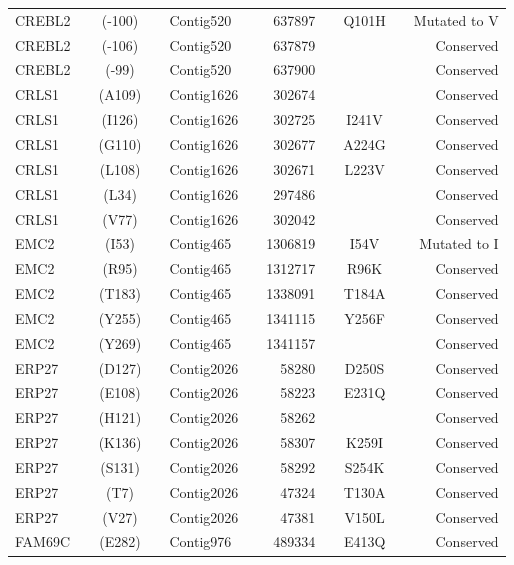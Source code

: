 \begin{center}
\begin{longtable}{lccclcrcccr}
CREBL2   & & (-100)  & & Contig520  & & 637897   & & Q101H   & & Mutated to V   \\
CREBL2   & & (-106)  & & Contig520  & & 637879   & &         & & Conserved      \\
CREBL2   & & (-99)   & & Contig520  & & 637900   & &         & & Conserved      \\
CRLS1    & & (A109)  & & Contig1626 & & 302674   & &         & & Conserved      \\
CRLS1    & & (I126)  & & Contig1626 & & 302725   & & I241V   & & Conserved      \\
CRLS1    & & (G110)  & & Contig1626 & & 302677   & & A224G   & & Conserved      \\
CRLS1    & & (L108)  & & Contig1626 & & 302671   & & L223V   & & Conserved      \\
CRLS1    & & (L34)   & & Contig1626 & & 297486   & &         & & Conserved      \\
CRLS1    & & (V77)   & & Contig1626 & & 302042   & &         & & Conserved      \\
EMC2     & & (I53)   & & Contig465  & & 1306819  & & I54V    & & Mutated to I   \\
EMC2     & & (R95)   & & Contig465  & & 1312717  & & R96K    & & Conserved      \\
EMC2     & & (T183)  & & Contig465  & & 1338091  & & T184A   & & Conserved      \\
EMC2     & & (Y255)  & & Contig465  & & 1341115  & & Y256F   & & Conserved      \\
EMC2     & & (Y269)  & & Contig465  & & 1341157  & &         & & Conserved      \\
ERP27    & & (D127)  & & Contig2026 & & 58280    & & D250S   & & Conserved      \\
ERP27    & & (E108)  & & Contig2026 & & 58223    & & E231Q   & & Conserved      \\
ERP27    & & (H121)  & & Contig2026 & & 58262    & &         & & Conserved      \\
ERP27    & & (K136)  & & Contig2026 & & 58307    & & K259I   & & Conserved      \\
ERP27    & & (S131)  & & Contig2026 & & 58292    & & S254K   & & Conserved      \\
ERP27    & & (T7)    & & Contig2026 & & 47324    & & T130A   & & Conserved      \\
ERP27    & & (V27)   & & Contig2026 & & 47381    & & V150L   & & Conserved      \\
FAM69C   & & (E282)  & & Contig976  & & 489334   & & E413Q   & & Conserved      \\

\end{longtable}
\end{center}
